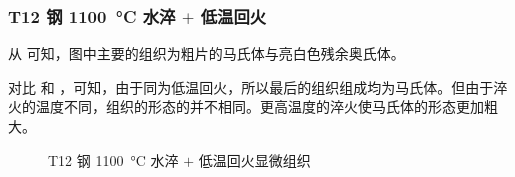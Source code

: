    \subsubsection{T12 钢 \SI{1100}{\degreeCelsius} 水淬 $+$ 低温回火\label{ss2:t12_1100}}
    从 可知，图中主要的组织为粗片的马氏体与亮白色残余奥氏体。\par
    对比  和 ，可知，由于同为低温回火，所以最后的组织组成均为马氏体。但由于淬火的温度不同，组织的形态的并不相同。更高温度的淬火使马氏体的形态更加粗大。
    \begin{figure}[!ht]
        \hspace{20pt}
        \caption{T12 钢 \SI{1100}{\degreeCelsius} 水淬 $+$ 低温回火显微组织\label{fig:n14}}
    \end{figure}
